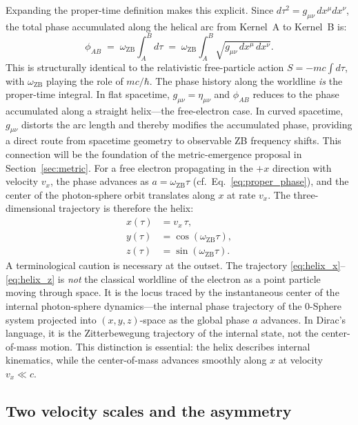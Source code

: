 \documentclass[%
 reprint, amsmath,amssymb, aps, prb, ]{revtex4-2}
\numberwithin{equation}{section}
\newcommand{\omZB}{\omega_{\text{ZB}}}
\begin{document}
Expanding the proper-time definition makes this explicit. Since $d\tau^2 = g_{\mu\nu}\,dx^\mu dx^\nu$, the total phase accumulated along the helical arc from Kernel~A to Kernel~B is:
\begin{equation}
\phi_{AB} \;=\; \omZB \int_{A}^{B} d\tau \;=\; \omZB \int_{A}^{B} \sqrt{g_{\mu\nu}\,dx^\mu\,dx^\nu}.
\label{eq:phase_worldline}
\end{equation}
This is structurally identical to the relativistic free-particle action $S = -mc\int d\tau$, with $\omZB$ playing the role of $mc/\hbar$. The phase history along the worldline \emph{is} the proper-time integral. In flat spacetime, $g_{\mu\nu} = \eta_{\mu\nu}$ and $\phi_{AB}$ reduces to the phase accumulated along a straight helix---the free-electron case. In curved spacetime, $g_{\mu\nu}$ distorts the arc length and thereby modifies the accumulated phase, providing a direct route from spacetime geometry to observable ZB frequency shifts. This connection will be the foundation of the metric-emergence proposal in Section~\ref{sec:metric}. For a free electron propagating in the $+x$ direction with velocity $v_x$, the phase advances as $a = \omZB \tau$ (cf.\ Eq.~\eqref{eq:proper_phase}), and the center of the photon-sphere orbit translates along $x$ at rate $v_x$. The three-dimensional trajectory is therefore the helix:
\begin{align}
x(\tau) &= v_x\, \tau, \label{eq:helix_x}\\
y(\tau) &= \cos(\omZB \tau), \label{eq:helix_y}\\
z(\tau) &= \sin(\omZB \tau). \label{eq:helix_z}
\end{align}
A terminological caution is necessary at the outset. The trajectory \eqref{eq:helix_x}--\eqref{eq:helix_z} is \emph{not} the classical worldline of the electron as a point particle moving through space. It is the locus traced by the instantaneous center of the internal photon-sphere dynamics---the internal phase trajectory of the 0-Sphere system projected into $(x,y,z)$-space as the global phase $a$ advances. In Dirac's language, it is the Zitterbewegung trajectory of the internal state, not the center-of-mass motion. This distinction is essential: the helix describes internal kinematics, while the center-of-mass advances smoothly along $x$ at velocity $v_x \ll c$.

\subsection{Two velocity scales and the asymmetry}
\label{subsec:twovelocities}
\end{document}
